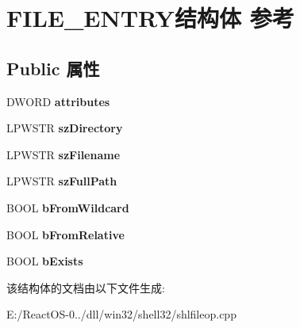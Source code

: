 \hypertarget{struct_f_i_l_e___e_n_t_r_y}{}\section{F\+I\+L\+E\+\_\+\+E\+N\+T\+R\+Y结构体 参考}
\label{struct_f_i_l_e___e_n_t_r_y}
\subsection*{Public 属性}
\begin{DoxyCompactItemize}
\item 
\mbox{\label{struct_f_i_l_e___e_n_t_r_y_a4bf7916e9b54c87f5a00fda537a28ffa}} 
D\+W\+O\+RD {\bfseries attributes}
\item 
\mbox{\label{struct_f_i_l_e___e_n_t_r_y_ae360823e68942b20536b40625c8a776a}} 
L\+P\+W\+S\+TR {\bfseries sz\+Directory}
\item 
\mbox{\label{struct_f_i_l_e___e_n_t_r_y_a4c31b44de8d2376d4f5082682c42e9c5}} 
L\+P\+W\+S\+TR {\bfseries sz\+Filename}
\item 
\mbox{\label{struct_f_i_l_e___e_n_t_r_y_a5d32cf43674b5a354620eac995775439}} 
L\+P\+W\+S\+TR {\bfseries sz\+Full\+Path}
\item 
\mbox{\label{struct_f_i_l_e___e_n_t_r_y_a10fbaafbddbcd210c92ef494494de0a8}} 
B\+O\+OL {\bfseries b\+From\+Wildcard}
\item 
\mbox{\label{struct_f_i_l_e___e_n_t_r_y_a6cd0b1c951fdd8b5861b12018d9d64fc}} 
B\+O\+OL {\bfseries b\+From\+Relative}
\item 
\mbox{\label{struct_f_i_l_e___e_n_t_r_y_a588a6756430e2a24b47a25a5300669cb}} 
B\+O\+OL {\bfseries b\+Exists}
\end{DoxyCompactItemize}


该结构体的文档由以下文件生成\+:\begin{DoxyCompactItemize}
\item 
E\+:/\+React\+O\+S-\/0../dll/win32/shell32/shlfileop.\+cpp\end{DoxyCompactItemize}
